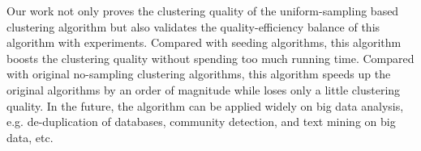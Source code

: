 \begin{englishabstract}
Our work not only proves the clustering quality of the uniform-sampling based clustering algorithm but also validates the quality-efficiency balance of this algorithm with experiments. Compared with seeding algorithms, this algorithm boosts the clustering quality without spending too much running time. Compared with original no-sampling clustering algorithms, this algorithm speeds up the original algorithms by an order of magnitude while loses only a little clustering quality. In the future, the algorithm can be applied widely on big data analysis, e.g. de-duplication of databases, community detection, and text mining on big data, etc.

\end{englishabstract}


